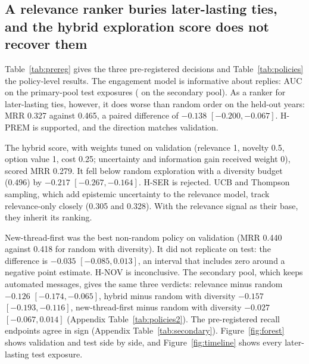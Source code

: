\documentclass[11pt]{article}
\begin{document}
\subsection{A relevance ranker buries later-lasting ties, and the hybrid exploration score does not recover them}

Table~\ref{tab:prereg} gives the three pre-registered decisions and Table~\ref{tab:policies} the policy-level results. The engagement model is informative about replies: AUC \aucPrimaryTest{} on the \nPTeExp{} primary-pool test exposures (\aucSecondaryTest{} on the secondary pool). As a ranker for later-lasting ties, however, it does worse than random order on the held-out years: MRR 0.327 against 0.465, a paired difference of $-0.138$ $[-0.200, -0.067]$. H-PREM is supported, and the direction matches validation.

The hybrid score, with weights tuned on validation (relevance 1, novelty 0.5, option value 1, cost 0.25; uncertainty and information gain received weight 0), scored MRR 0.279. It fell below random exploration with a diversity budget (0.496) by $-0.217$ $[-0.267, -0.164]$. H-SER is rejected. UCB and Thompson sampling, which add epistemic uncertainty to the relevance model, track relevance-only closely (0.305 and 0.328). With the relevance signal as their base, they inherit its ranking.

New-thread-first was the best non-random policy on validation (MRR 0.440 against 0.418 for random with diversity). It did not replicate on test: the difference is $-0.035$ $[-0.085, 0.013]$, an interval that includes zero around a negative point estimate. H-NOV is inconclusive. The secondary pool, which keeps automated messages, gives the same three verdicts: relevance minus random $-0.126$ $[-0.174, -0.065]$, hybrid minus random with diversity $-0.157$ $[-0.193, -0.116]$, new-thread-first minus random with diversity $-0.027$ $[-0.067, 0.014]$ (Appendix Table~\ref{tab:policies2}). The pre-registered recall endpoints agree in sign (Appendix Table~\ref{tab:secondary}). Figure~\ref{fig:forest} shows validation and test side by side, and Figure~\ref{fig:timeline} shows every later-lasting test exposure.

\begin{table}[t]
\centering
\footnotesize

\caption{Pre-registered hypotheses, primary pool: paired per-week MRR differences with 95\% cluster-bootstrap intervals over scored weeks (validation \nPVaScored{} weeks, test \nPTeScored{} weeks). H-PREM is relevance-only minus random. H-SER is the hybrid score minus random with a diversity budget. H-NOV is new-thread-first minus the same baseline. Decision rules are in Section~\ref{sec:methods}. The permuted column shuffles outcome labels within each test week; every interval then includes zero, as it should.}
\label{tab:prereg}
\end{table}
\end{document}
